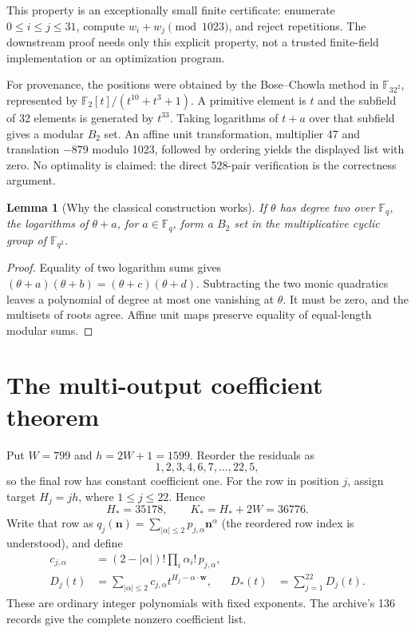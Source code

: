 \documentclass[11pt]{article}
\newtheorem{lemma}[theorem]{Lemma}
\begin{document}
This property is an exceptionally small finite certificate: enumerate
$0\le i\le j\le31$, compute $w_i+w_j\pmod{1023}$, and reject repetitions.
The downstream proof needs only this explicit property, not a trusted
finite-field implementation or an optimization program.

For provenance, the positions were obtained by the Bose--Chowla method in
$\mathbb F_{32^2}$, represented by $\mathbb F_2[t]/(t^{10}+t^3+1)$.
A primitive element is $t$ and the subfield of 32 elements is generated by
$t^{33}$. Taking logarithms of $t+a$ over that subfield gives a modular
$B_2$ set. An affine unit transformation, multiplier 47 and translation
$-879$ modulo 1023, followed by ordering yields the displayed list with zero.
No optimality is claimed: the direct 528-pair verification is the correctness argument.

\begin{lemma}[Why the classical construction works]
If $\theta$ has degree two over $\mathbb F_q$, the logarithms of
$\theta+a$, for $a\in\mathbb F_q$, form a $B_2$ set in the multiplicative
cyclic group of $\mathbb F_{q^2}$.
\end{lemma}
\begin{proof}
Equality of two logarithm sums gives
$(\theta+a)(\theta+b)=(\theta+c)(\theta+d)$.
Subtracting the two monic quadratics leaves a polynomial of degree at most
one vanishing at $\theta$. It must be zero, and the multisets of roots agree.
Affine unit maps preserve equality of equal-length modular sums.
\end{proof}

\section{The multi-output coefficient theorem}\label{sec:multi}

Put $W=799$ and $h=2W+1=1599$. Reorder the residuals as
\[
1,2,3,4,6,7,\ldots,22,5,
\]
so the final row has constant coefficient one. For the row in position $j$,
assign target $H_j=jh$, where $1\le j\le22$. Hence
\[
 H_*=35178,\qquad K_*=H_*+2W=36776.
\]
Write that row as $q_j(\mathbf n)=\sum_{|\alpha|\le2}p_{j,\alpha}\mathbf n^\alpha$
(the reordered row index is understood), and define
\begin{align}
 c_{j,\alpha}&=(2-|\alpha|)!\prod_i\alpha_i!\,p_{j,\alpha},\label{eq:c}\tag{C}\\
 D_j(t)&=\sum_{|\alpha|\le2}c_{j,\alpha}t^{H_j-\alpha\cdot\mathbf w},
 &D_*(t)&=\sum_{j=1}^{22}D_j(t).\label{eq:D}
\end{align}
These are ordinary integer polynomials with fixed exponents. The archive's
136 records give the complete nonzero coefficient list.
\end{document}
